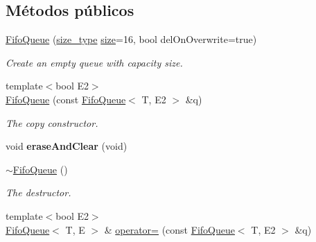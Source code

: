 \subsection*{\-Métodos públicos}
\begin{DoxyCompactItemize}
\item 
\hypertarget{classxsens_1_1FifoQueue_aba62295440c162d8d5cbab74bf09e53e}{\hyperlink{classxsens_1_1FifoQueue_aba62295440c162d8d5cbab74bf09e53e}{\-Fifo\-Queue} (\hyperlink{classxsens_1_1FifoQueue_a6a595ab989816ba96cf0cbfa4d39b0b1}{size\-\_\-type} \hyperlink{classxsens_1_1FifoQueue_abdc9950e2a5833b2520b83bc1daee995}{size}=16, bool del\-On\-Overwrite=true)}\label{classxsens_1_1FifoQueue_aba62295440c162d8d5cbab74bf09e53e}

\begin{DoxyCompactList}\small\item\em \-Create an empty queue with capacity size. \end{DoxyCompactList}\item 
\hypertarget{classxsens_1_1FifoQueue_a848cf288889b759f331cd35532f95832}{{\footnotesize template$<$bool \-E2$>$ }\\\hyperlink{classxsens_1_1FifoQueue_a848cf288889b759f331cd35532f95832}{\-Fifo\-Queue} (const \hyperlink{classxsens_1_1FifoQueue}{\-Fifo\-Queue}$<$ \-T, \-E2 $>$ \&q)}\label{classxsens_1_1FifoQueue_a848cf288889b759f331cd35532f95832}

\begin{DoxyCompactList}\small\item\em \-The copy constructor. \end{DoxyCompactList}\item 
\hypertarget{classxsens_1_1FifoQueue_a7127b28f9107af06ae9590a95ad1c89f}{void {\bfseries erase\-And\-Clear} (void)}\label{classxsens_1_1FifoQueue_a7127b28f9107af06ae9590a95ad1c89f}

\item 
\hypertarget{classxsens_1_1FifoQueue_a9bc44c0ea07343fb6b2f594208174a32}{\hyperlink{classxsens_1_1FifoQueue_a9bc44c0ea07343fb6b2f594208174a32}{$\sim$\-Fifo\-Queue} ()}\label{classxsens_1_1FifoQueue_a9bc44c0ea07343fb6b2f594208174a32}

\begin{DoxyCompactList}\small\item\em \-The destructor. \end{DoxyCompactList}\item 
\hypertarget{classxsens_1_1FifoQueue_a602b54c4b491ec24fe3bc59a5d9ec69a}{{\footnotesize template$<$bool \-E2$>$ }\\\hyperlink{classxsens_1_1FifoQueue}{\-Fifo\-Queue}$<$ \-T, \-E $>$ \& \hyperlink{classxsens_1_1FifoQueue_a602b54c4b491ec24fe3bc59a5d9ec69a}{operator=} (const \hyperlink{classxsens_1_1FifoQueue}{\-Fifo\-Queue}$<$ \-T, \-E2 $>$ \&q)}\label{classxsens_1_1FifoQueue_a602b54c4b491ec24fe3bc59a5d9ec69a}


\end{DoxyCompactItemize}
